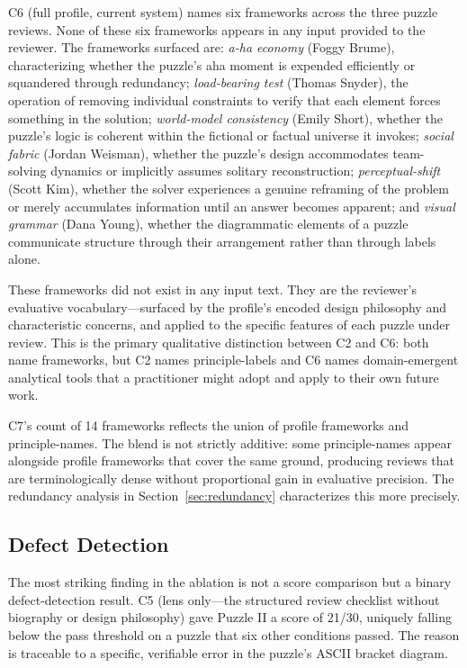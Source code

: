 C6 (full profile, current system) names six frameworks across the three puzzle reviews. None of these six frameworks appears in any input provided to the reviewer. The frameworks surfaced are: \emph{a-ha economy} (Foggy Brume), characterizing whether the puzzle's aha moment is expended efficiently or squandered through redundancy; \emph{load-bearing test} (Thomas Snyder), the operation of removing individual constraints to verify that each element forces something in the solution; \emph{world-model consistency} (Emily Short), whether the puzzle's logic is coherent within the fictional or factual universe it invokes; \emph{social fabric} (Jordan Weisman), whether the puzzle's design accommodates team-solving dynamics or implicitly assumes solitary reconstruction; \emph{perceptual-shift} (Scott Kim), whether the solver experiences a genuine reframing of the problem or merely accumulates information until an answer becomes apparent; and \emph{visual grammar} (Dana Young), whether the diagrammatic elements of a puzzle communicate structure through their arrangement rather than through labels alone.

These frameworks did not exist in any input text. They are the reviewer's evaluative vocabulary---surfaced by the profile's encoded design philosophy and characteristic concerns, and applied to the specific features of each puzzle under review. This is the primary qualitative distinction between C2 and C6: both name frameworks, but C2 names principle-labels and C6 names domain-emergent analytical tools that a practitioner might adopt and apply to their own future work.

C7's count of 14 frameworks reflects the union of profile frameworks and principle-names. The blend is not strictly additive: some principle-names appear alongside profile frameworks that cover the same ground, producing reviews that are terminologically dense without proportional gain in evaluative precision. The redundancy analysis in Section~\ref{sec:redundancy} characterizes this more precisely.

\subsection{Defect Detection}
\label{sec:defects}

The most striking finding in the ablation is not a score comparison but a binary defect-detection result. C5 (lens only---the structured review checklist without biography or design philosophy) gave Puzzle II a score of 21/30, uniquely falling below the pass threshold on a puzzle that six other conditions passed. The reason is traceable to a specific, verifiable error in the puzzle's ASCII bracket diagram.

